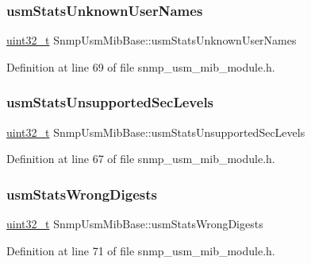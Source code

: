\subsubsection{\texorpdfstring{usm\+Stats\+Unknown\+User\+Names}{usmStatsUnknownUserNames}}
{\footnotesize\ttfamily \hyperlink{stdint_8h_a435d1572bf3f880d55459d9805097f62}{uint32\+\_\+t} Snmp\+Usm\+Mib\+Base\+::usm\+Stats\+Unknown\+User\+Names}



Definition at line 69 of file snmp\+\_\+usm\+\_\+mib\+\_\+module.\+h.

\mbox{\label{structSnmpUsmMibBase_ac846e62c7d7821fc707a4a36fd4a4cbc}} 
\subsubsection{\texorpdfstring{usm\+Stats\+Unsupported\+Sec\+Levels}{usmStatsUnsupportedSecLevels}}
{\footnotesize\ttfamily \hyperlink{stdint_8h_a435d1572bf3f880d55459d9805097f62}{uint32\+\_\+t} Snmp\+Usm\+Mib\+Base\+::usm\+Stats\+Unsupported\+Sec\+Levels}



Definition at line 67 of file snmp\+\_\+usm\+\_\+mib\+\_\+module.\+h.

\mbox{\label{structSnmpUsmMibBase_a3120fcc60f60bd2ad9c9c07734d36997}} 
\subsubsection{\texorpdfstring{usm\+Stats\+Wrong\+Digests}{usmStatsWrongDigests}}
{\footnotesize\ttfamily \hyperlink{stdint_8h_a435d1572bf3f880d55459d9805097f62}{uint32\+\_\+t} Snmp\+Usm\+Mib\+Base\+::usm\+Stats\+Wrong\+Digests}



Definition at line 71 of file snmp\+\_\+usm\+\_\+mib\+\_\+module.\+h.

\mbox{\label{structSnmpUsmMibBase_a48469936e03465ca06110ee6ef0fde8f}} 
